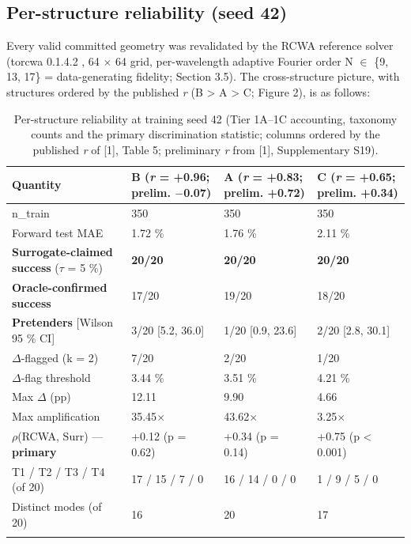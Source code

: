 \documentclass[11pt,a4paper]{article}
\begin{document}
\subsection{Per-structure reliability (seed 42)}\label{sec:3.2}

Every valid committed geometry was revalidated by the RCWA reference solver (torcwa
0.1.4.2 \cite{kim202346}, 64 \ensuremath{\times} 64 grid, per-wavelength adaptive Fourier order
N \ensuremath{\in} \{9, 13, 17\} = data-generating fidelity; Section 3.5). The cross-structure picture,
with structures ordered by the published \emph{r} (B \textgreater{} A \textgreater{} C; Figure 2), is as follows:

\begin{table}[htbp]
\centering
\setlength{\tabcolsep}{2pt}\tiny
\caption{Per-structure reliability at training seed 42 (Tier 1A--1C accounting, taxonomy counts and the primary discrimination statistic; columns ordered by the published \emph{r} of {[}1{]}, Table 5; preliminary \emph{r} from {[}1{]}, Supplementary S19).}
\label{tab:6}
\begin{tabular}{@{}llll@{}}
\toprule\noalign{}
Quantity & B (\emph{r} = +0.96; prelim. \ensuremath{-}0.07) & A (\emph{r} = +0.83; prelim. +0.72) & C (\emph{r} = +0.65; prelim. +0.34) \\
\midrule\noalign{}
n\_train & 350 & 350 & 350 \\
Forward test MAE & 1.72 \% & 1.76 \% & 2.11 \% \\
\textbf{Surrogate-claimed success} (\ensuremath{\tau} = 5 \%) & \textbf{20/20} & \textbf{20/20} & \textbf{20/20} \\
\textbf{Oracle-confirmed success} & 17/20 & 19/20 & 18/20 \\
\textbf{Pretenders} {[}Wilson 95 \% CI{]} & 3/20 {[}5.2, 36.0{]} & 1/20 {[}0.9, 23.6{]} & 2/20 {[}2.8, 30.1{]} \\
\ensuremath{\Delta}-flagged (k = 2) & 7/20 & 2/20 & 1/20 \\
\ensuremath{\Delta}-flag threshold & 3.44 \% & 3.51 \% & 4.21 \% \\
Max \ensuremath{\Delta} (pp) & 12.11 & 9.90 & 4.66 \\
Max amplification & 35.45\ensuremath{\times} & 43.62\ensuremath{\times} & 3.25\ensuremath{\times} \\
\ensuremath{\rho}(RCWA, Surr) --- \textbf{primary} & +0.12 (p = 0.62) & +0.34 (p = 0.14) & +0.75 (p \textless{} 0.001) \\
T1 / T2 / T3 / T4 (of 20) & 17 / 15 / 7 / 0 & 16 / 14 / 0 / 0 & 1 / 9 / 5 / 0 \\
Distinct modes (of 20) & 16 & 20 & 17 \\
\bottomrule\noalign{}
\end{tabular}
\end{table}
\end{document}

